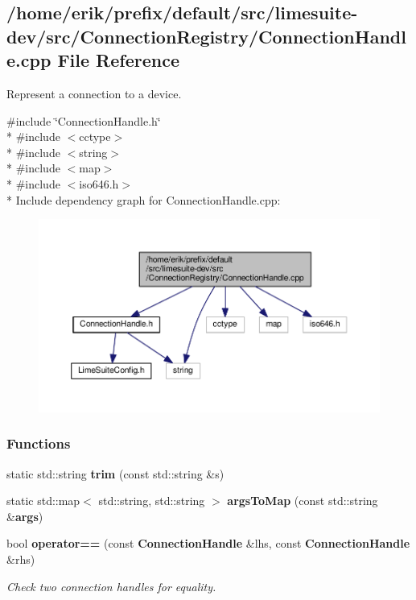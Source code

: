 \subsection{/home/erik/prefix/default/src/limesuite-\/dev/src/\+Connection\+Registry/\+Connection\+Handle.cpp File Reference}
\label{ConnectionHandle_8cpp}


Represent a connection to a device.  


{\ttfamily \#include \char`\"{}Connection\+Handle.\+h\char`\"{}}\\*
{\ttfamily \#include $<$cctype$>$}\\*
{\ttfamily \#include $<$string$>$}\\*
{\ttfamily \#include $<$map$>$}\\*
{\ttfamily \#include $<$iso646.\+h$>$}\\*
Include dependency graph for Connection\+Handle.\+cpp\+:
\nopagebreak
\begin{figure}[H]
\begin{center}
\leavevmode
\includegraphics[width=350pt]{d6/de9/ConnectionHandle_8cpp__incl}
\end{center}
\end{figure}
\subsubsection*{Functions}
\begin{DoxyCompactItemize}
\item 
static std\+::string {\bf trim} (const std\+::string \&s)
\item 
static std\+::map$<$ std\+::string, std\+::string $>$ {\bf args\+To\+Map} (const std\+::string \&{\bf args})
\item 
bool {\bf operator==} (const {\bf Connection\+Handle} \&lhs, const {\bf Connection\+Handle} \&rhs)
\begin{DoxyCompactList}\small\item\em Check two connection handles for equality. \end{DoxyCompactList}\end{DoxyCompactItemize}


